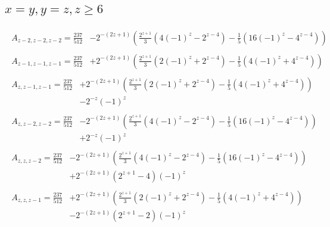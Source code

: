 \subsection*{$x=y,y=z,z\ge6$}
\begin{align*}
\begin{split}
A_{z-2,z-2,z-2}=\frac{237}{512} &-2^{-(2z+1)}\left(\frac{2^{z+1}}{3}\left(4(-1)^z-2^{z-4}\right)-\frac{1}{5}\left(16(-1)^z-4^{z-4}\right)\right)
\end{split}\\
\begin{split}
A_{z-1,z-1,z-1}=\frac{237}{512} &+2^{-(2z+1)}\left(\frac{2^{z+1}}{3}\left(2(-1)^z+2^{z-4}\right)-\frac{1}{5}\left(4(-1)^z+4^{z-4}\right)\right)
\end{split}\\
\begin{split}
A_{z,z-1,z-1}=\frac{237}{512} &+2^{-(2z+1)}\left(\frac{2^{z+1}}{3}\left(2(-1)^z+2^{z-4}\right)-\frac{1}{5}\left(4(-1)^z+4^{z-4}\right)\right)\\
& -2^{-z}(-1)^z
\end{split}\\
\begin{split}
A_{z,z-2,z-2}=\frac{237}{512} &-2^{-(2z+1)}\left(\frac{2^{z+1}}{3}\left(4(-1)^z-2^{z-4}\right)-\frac{1}{5}\left(16(-1)^z-4^{z-4}\right)\right)\\
& +2^{-z}(-1)^z
\end{split}\\
\begin{split}
A_{z,z,z-2}=\frac{237}{512} &-2^{-(2z+1)}\left(\frac{2^{z+1}}{3}\left(4(-1)^z-2^{z-4}\right)-\frac{1}{5}\left(16(-1)^z-4^{z-4}\right)\right)\\
& +2^{-(2z+1)}\left(2^{z+1}-4\right)(-1)^z
\end{split}\\
\begin{split}
A_{z,z,z-1}=\frac{237}{512} &+2^{-(2z+1)}\left(\frac{2^{z+1}}{3}\left(2(-1)^z+2^{z-4}\right)-\frac{1}{5}\left(4(-1)^z+4^{z-4}\right)\right)\\
& -2^{-(2z+1)}\left(2^{z+1}-2\right)(-1)^z
\end{split}
\end{align*}
%
